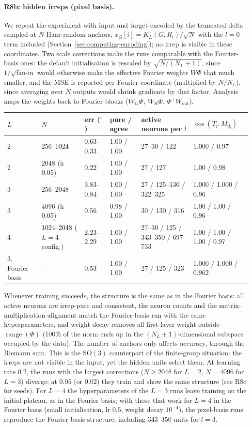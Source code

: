 \documentclass[a4paper,11pt]{article}
\theoremstyle{remark}
\theoremstyle{definition}
\newcommand{\SO}{\mathrm{SO}(3)}
\begin{document}
\paragraph{R8b: hidden irreps (pixel basis).} We repeat the experiment with
input and target encoded by the truncated delta sampled at $N$ Haar-random anchors,
$x_G[i]=K_L(G,R_i)/\sqrt N$ with the $l=0$ term included
(Section~\ref{sec:computing-encoding}); no irrep is visible in these coordinates.
Two scale corrections make the runs comparable with the Fourier-basis ones: the
default initialisation is rescaled by $\sqrt{N/(N_L+1)}$, since $1/\sqrt{\text{fan-in}}$
would otherwise make the effective Fourier weights $W\Phi$ that much smaller, and
the MSE is reported per Fourier coordinate (multiplied by $N/N_L$), since averaging
over $N$ outputs would shrink gradients by that factor. Analysis maps the weights
back to Fourier blocks ($W_G\Phi$, $W_H\Phi$, $\Phi^+W_{\mathrm{out}}$).

\begin{center}\small
\begin{tabular}{llllll}
\hline
$L$ & $N$ & err ($^\circ$) & pure / agree & active neurons per $l$ & $\cos(T_l,M_{d_l})$\\
\hline
2 & 256--1024 & 0.63--0.33 & 1.00 / 1.00 & 27--30 / 122 & 1.000 / 0.97\\
2 & 2048 (lr 0.05) & 0.22 & 1.00 / 1.00 & 27 / 127 & 1.00 / 0.98\\
3 & 256--2048 & 3.83--0.84 & 1.00 / 1.00 & 27 / 125--130 / 322--325 & 1.000 / 1.000 / 0.96\\
3 & 4096 (lr 0.05) & 0.56 & 0.98 / 1.00 & 30 / 130 / 316 & 1.00 / 1.00 / 0.96\\
4 & 1024--2048 ($L{=}4$ config.) & 2.23--2.29 & 1.00 / 1.00 & 27--30 / 125 / 343--350 / 697--733 & 1.00 / 1.00 / 1.00 / 0.97\\
3, Fourier basis & --- & 0.53 & 1.00 / 1.00 & 27 / 125 / 323 & 1.000 / 1.000 / 0.962\\
\hline
\end{tabular}
\end{center}

Whenever training succeeds, the structure is the same as in the Fourier basis:
all active neurons are irrep-pure and consistent, the neuron counts and the
matrix-multiplication alignment match the Fourier-basis run with the same
hyperparameters, and weight decay removes all first-layer weight outside
$\operatorname{range}(\Phi)$ (100\% of the norm ends up in the $(N_L+1)$-dimensional
subspace occupied by the data). The number of anchors only affects accuracy,
through the Riemann sum. This is the $\SO$ counterpart of the finite-group
situation: the irreps are not visible in the input, yet the hidden units select
them. At learning rate $0.2$, the runs with the largest corrections ($N\ge2048$
for $L=2$, $N=4096$ for $L=3$) diverge; at $0.05$ (or $0.02$) they train and show
the same structure (see R8c for seeds). For $L=4$ the hyperparameters of the $L=3$
runs leave training on the initial plateau, as in the Fourier basis; with those that
work for $L=4$ in the Fourier basis (small initialisation, lr $0.5$, weight decay
$10^{-4}$), the pixel-basis runs reproduce the Fourier-basis structure, including
$343$--$350$ units for $l=3$.
\end{document}
